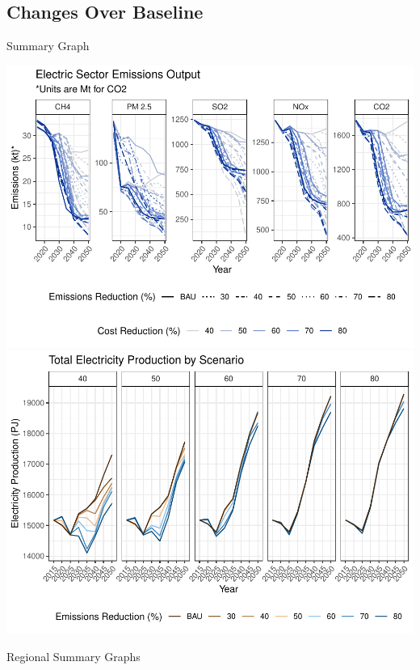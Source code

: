 \documentclass[]{article}
\begin{document}
\hypertarget{changes-over-baseline}{%
\subsection{Changes Over Baseline}\label{changes-over-baseline}}

Summary Graph

\includegraphics{osw_Report_files/figure-latex/unnamed-chunk-55-1.pdf}
\includegraphics{osw_Report_files/figure-latex/unnamed-chunk-56-1.pdf}

Regional Summary Graphs
\end{document}

